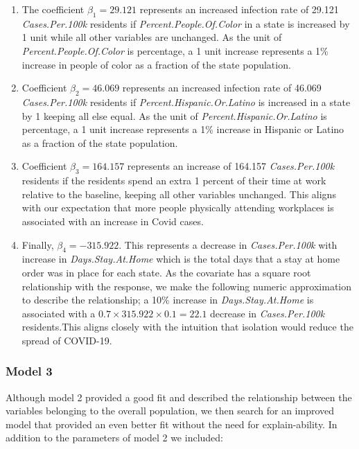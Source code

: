 \documentclass[
]{article}
\providecommand{\tightlist}{%
  \setlength{\itemsep}{0pt}\setlength{\parskip}{0pt}}
\begin{document}
\begin{enumerate}
\def\labelenumi{\arabic{enumi}.}
\tightlist
\item
  The coefficient \(\beta_1 = 29.121\) represents an increased infection
  rate of 29.121 \emph{Cases.Per.100k} residents if
  \emph{Percent.People.Of.Color} in a state is increased by 1 unit while
  all other variables are unchanged. As the unit of
  \emph{Percent.People.Of.Color} is percentage, a 1 unit increase
  represents a 1\% increase in people of color as a fraction of the
  state population.
\item
  Coefficient \(\beta_2 = 46.069\) represents an increased infection
  rate of 46.069 \emph{Cases.Per.100k} residents if
  \emph{Percent.Hispanic.Or.Latino} is increased in a state by 1 keeping
  all else equal. As the unit of \emph{Percent.Hispanic.Or.Latino} is
  percentage, a 1 unit increase represents a 1\% increase in Hispanic or
  Latino as a fraction of the state population.
\item
  Coefficient \(\beta_3 = 164.157\) represents an increase of 164.157
  \emph{Cases.Per.100k} residents if the residents spend an extra 1
  percent of their time at work relative to the baseline, keeping all
  other variables unchanged. This aligns with our expectation that more
  people physically attending workplaces is associated with an increase
  in Covid cases.
\item
  Finally, \(\beta_4 = -315.922\). This represents a decrease in
  \emph{Cases.Per.100k} with increase in \emph{Days.Stay.At.Home} which
  is the total days that a stay at home order was in place for each
  state. As the covariate has a square root relationship with the
  response, we make the following numeric approximation to describe the
  relationship; a 10\% increase in \emph{Days.Stay.At.Home} is
  associated with a \(0.7 \times 315.922 \times 0.1 = 22.1\) decrease in
  \emph{Cases.Per.100k} residents.This aligns closely with the intuition
  that isolation would reduce the spread of COVID-19.
\end{enumerate}

\hypertarget{model-3}{%
\subsubsection{Model 3}\label{model-3}}

Although model 2 provided a good fit and described the relationship
between the variables belonging to the overall population, we then
search for an improved model that provided an even better fit without
the need for explain-ability. In addition to the parameters of model 2
we included:
\end{document}
